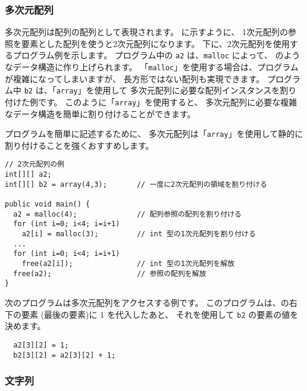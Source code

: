 \subsubsection{多次元配列}

多次元配列は配列の配列として表現されます。
に示すように、
1次元配列の参照を要素とした配列を使うと2次元配列になります。
下に、2次元配列を使用するプログラム例を示します。
プログラム中の \verb/a2/ は、\verb/malloc/ によって、
のようなデータ構造に作り上げられます。
「\verb/malloc/」を使用する場合は、プログラムが複雑になってしまいますが、
長方形ではない配列も実現できます。
プログラム中 \verb/b2/ は、「\verb/array/」を使用して
多次元配列に必要な配列インスタンスを割り付けた例です。
このように「\verb/array/」を使用すると、
多次元配列に必要な複雑なデータ構造を簡単に割り付けることができます。

プログラムを簡単に記述するために、
多次元配列は「\verb/array/」を使用して静的に割り付けることを強くおすすめします。


\begin{mylist}
\begin{verbatim}
// 2次元配列の例
int[][] a2;
int[][] b2 = array(4,3);       // 一度に2次元配列の領域を割り付ける

public void main() {
  a2 = malloc(4);              // 配列参照の配列を割り付ける
  for (int i=0; i<4; i=i+1)
    a2[i] = malloc(3);         // int 型の1次元配列を割り付ける
  ...
  for (int i=0; i<4; i=i+1)
    free(a2[i]);               // int 型の1次元配列を解放
  free(a2);                    // 参照の配列を解放
}
\end{verbatim}
\end{mylist}

次のプログラムは多次元配列をアクセスする例です。
このプログラムは、の右下の要素
(最後の要素)に 1 を代入したあと、
それを使用して \verb/b2/ の要素の値を決めます。

\begin{mylist}
\begin{verbatim}
  a2[3][2] = 1;
  b2[3][2] = a2[3][2] + 1;
\end{verbatim}
\end{mylist}

\subsubsection{文字列}

